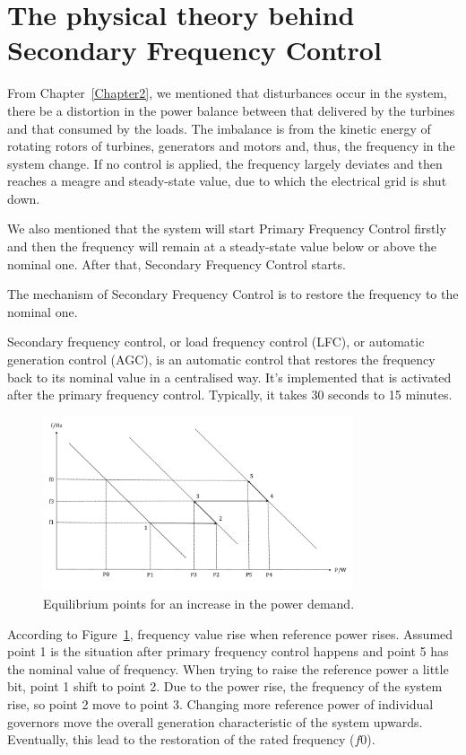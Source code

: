 \section{The physical theory behind Secondary Frequency Control} %

From Chapter~\ref{Chapter2}, we mentioned that disturbances occur in the system, there be a distortion in the power balance between that delivered by the turbines and that consumed by the loads. The imbalance is from the kinetic energy of rotating rotors of turbines, generators and motors and, thus, the frequency in the system change. If no control is applied, the frequency largely deviates and then reaches a meagre and steady-state value, due to which the electrical grid is shut down.  

We also mentioned that the system will start Primary Frequency Control firstly and then the frequency will remain at a steady-state value below or above the nominal one. After that, Secondary Frequency Control starts. 

The mechanism of Secondary Frequency Control is to restore the frequency to the nominal one. 

Secondary frequency control, or load frequency control (LFC), or automatic generation control (AGC), is an automatic control that restores the frequency back to its nominal value in a centralised way. It's implemented that is activated after the primary frequency control. Typically, it takes 30 seconds to 15 minutes. 

\begin{figure}[htbp]
\centering
\includegraphics[width = 0.816\textwidth]{figure/3_1_Equilibrium.pdf}
\caption{Equilibrium points for an increase in the power demand.}
\label{3_1_Equilibrium}
\end{figure}

According to Figure~\ref{3_1_Equilibrium}, frequency value rise when reference power rises. Assumed point 1 is the situation after primary frequency control happens and point 5 has the nominal value of frequency. When trying to raise the reference power a little bit, point 1 shift to point 2. Due to the power rise, the frequency of the system rise, so point 2 move to point 3. Changing more reference power of individual governors move the overall generation characteristic of the system upwards. Eventually, this lead to the restoration of the rated frequency ($f0$). 

